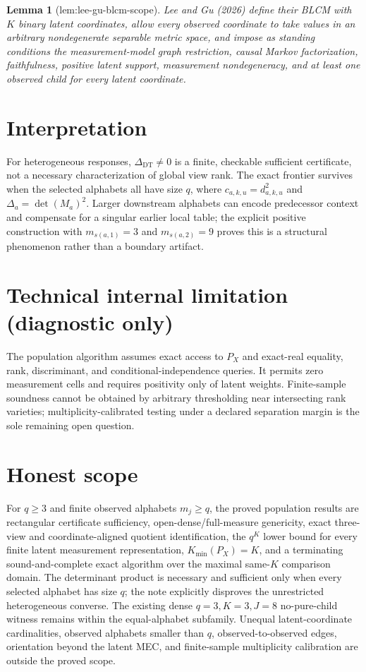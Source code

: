 \documentclass{article}
\newtheorem{lemma}{Lemma}
\begin{document}
\begin{lemma}[lem:lee-gu-blcm-scope]\label{lem:lee-gu-blcm-scope}
Lee and Gu (2026) define their BLCM with \(K\) binary latent coordinates,
allow every observed coordinate to take values in an arbitrary nondegenerate
separable metric space, and impose as standing conditions the
measurement-model graph restriction, causal Markov factorization,
faithfulness, positive latent support, measurement nondegeneracy, and at
least one observed child for every latent coordinate.
\end{lemma}

\section{Interpretation}

For heterogeneous responses, \(\Delta_{\mathrm{DT}}\neq0\) is a finite, checkable sufficient certificate, not a necessary characterization of global view rank.  The exact frontier survives when the selected alphabets all have size \(q\), where \(c_{a,k,u}=d_{a,k,u}^2\) and \(\Delta_a=\det(M_a)^2\).  Larger downstream alphabets can encode predecessor context and compensate for a singular earlier local table; the explicit positive construction with \(m_{s(a,1)}=3\) and \(m_{s(a,2)}=9\) proves this is a structural phenomenon rather than a boundary artifact.

\section*{Technical internal limitation (diagnostic only)}

The population algorithm assumes exact access to \(P_X\) and exact-real equality, rank, discriminant, and conditional-independence queries.  It permits zero measurement cells and requires positivity only of latent weights.  Finite-sample soundness cannot be obtained by arbitrary thresholding near intersecting rank varieties; multiplicity-calibrated testing under a declared separation margin is the sole remaining open question.

\section{Honest scope}

For \(q\ge3\) and finite observed alphabets \(m_j\ge q\), the proved population results are rectangular certificate sufficiency, open-dense/full-measure genericity, exact three-view and coordinate-aligned quotient identification, the \(q^K\) lower bound for every finite latent measurement representation, \(K_{\min}(P_X)=K\), and a terminating sound-and-complete exact algorithm over the maximal same-\(K\) comparison domain.  The determinant product is necessary and sufficient only when every selected alphabet has size \(q\); the note explicitly disproves the unrestricted heterogeneous converse.  The existing dense \(q=3,K=3,J=8\) no-pure-child witness remains within the equal-alphabet subfamily.  Unequal latent-coordinate cardinalities, observed alphabets smaller than \(q\), observed-to-observed edges, orientation beyond the latent MEC, and finite-sample multiplicity calibration are outside the proved scope.
\end{document}
